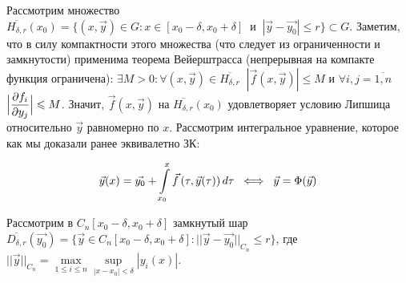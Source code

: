 \noindent \Proof Рассмотрим множество $\overline{H_{\delta, r}} (x_0) = \{ (x, \vec{y}) \in G: x \in [x_0 - \delta, x_0 + \delta] \;\; \text{и} \;\; |\vec{y} - \vec{y_0}| \leqslant r \} \subset G$. \newline Заметим, что в силу компактности этого множества (что следует из ограниченности и замкнутости) применима теорема Вейерштрасса (непрерывная на компакте функция ограничена): $\exists M > 0: \forall (x, \vec{y}) \in \overline{H_{\delta, r}} \;\; |\vec{f} (x, \vec{y})| \leqslant M$ \; и \; $\forall i, j =  \overline{1, n}$\;\; $\Big|\mathlarger{\frac{\partial f_i}{\partial y_j}}\Big| \leqslant M$. \newline Значит, $\vec{f}(x, \vec{y})$ на $\overline{H_{\delta, r}} (x_0)$ удовлетворяет условию Липшица относительно $\vec{y}$ равномерно по $x$. \newline Рассмотрим интегральное уравнение, которое как мы доказали ранее эквивалетно ЗК:

\begin{equation*}
    \vec{y}(x) = \vec{y_0} + \int \limits_{x_0}^x \vec{f}\left({\tau, \vec{y}(\tau)}\right) d\tau \;\;\Longleftrightarrow \;\;\vec{y} = \Phi(\vec{y})
\end{equation*}

Рассмотрим в $C_n [x_0 - \delta, x_0 + \delta]$ замкнутый шар $\overline{D_{\delta, r}}(\vec{y_0}) = \{ \vec{y} \in C_n [x_0 - \delta, x_0 + \delta]: {||\vec{y} - \vec{y_0}||}_{C_n} \leqslant r \}$, где ${||\vec{y}||}_{C_n} = \max \limits_{1 \leqslant i \leqslant n} \sup \limits_{|x - x_0| < \delta} |y_i (x)|$. 

